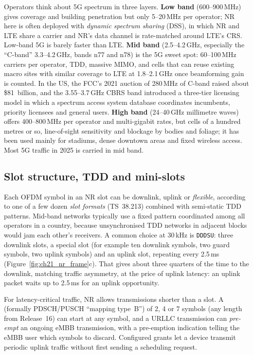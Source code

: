 \begin{inpractice}
Operators think about 5G spectrum in three layers. \textbf{Low band} (600--900\,MHz) gives coverage
and building penetration but only 5--20\,MHz per operator; NR here is often deployed with
\emph{dynamic spectrum sharing} (DSS), in which NR and LTE share a carrier and NR's data channel is
rate-matched around LTE's CRS. Low-band 5G is barely faster than LTE. \textbf{Mid band}
(2.5--4.2\,GHz, especially the ``C-band'' 3.3--4.2\,GHz, bands n77 and n78) is the 5G sweet spot:
60--100\,MHz carriers per operator, TDD, massive MIMO, and cells that can reuse existing macro sites
with similar coverage to LTE at 1.8--2.1\,GHz once beamforming gain is counted. In the US, the FCC's
2021 auction of 280\,MHz of C-band raised about \$81~billion, and the 3.55--3.7\,GHz CBRS band
introduced a three-tier licensing model in which a spectrum access system database coordinates
incumbents, priority licensees and general users. \textbf{High band} (24--40\,GHz millimetre waves)
offers 400--800\,MHz per operator and multi-gigabit rates, but cells of a hundred metres or so,
line-of-sight sensitivity and blockage by bodies and foliage; it has been used mainly for stadiums,
dense downtown areas and fixed wireless access. Most 5G traffic in 2025 is carried in mid band.
\end{inpractice}

\subsection{Slot structure, TDD and mini-slots}

Each OFDM symbol in an NR slot can be downlink, uplink or \emph{flexible}, according to one of a few
dozen \emph{slot formats} (TS~38.213) combined with semi-static TDD patterns. Mid-band networks
typically use a fixed pattern coordinated among all operators in a country, because unsynchronised
TDD networks in adjacent blocks would jam each other's receivers. A common choice at 30\,kHz is
\texttt{DDDSU}: three downlink slots, a special slot (for example ten downlink symbols, two guard
symbols, two uplink symbols) and an uplink slot, repeating every 2.5\,ms
(Figure~\ref{fig:ch21_nr_frame}c). That gives about three quarters of the time to the downlink,
matching traffic asymmetry, at the price of uplink latency: an uplink packet waits up to 2.5\,ms for
an uplink opportunity.

For latency-critical traffic, NR allows transmissions shorter than a slot. A 
(formally PDSCH/PUSCH ``mapping type~B'') of 2, 4 or 7 symbols (any length from Release~16) can start
at any symbol, and a URLLC transmission can \emph{pre-empt} an ongoing eMBB transmission, with a
pre-emption indication telling the eMBB user which symbols to discard. Configured grants let a device
transmit periodic uplink traffic without first sending a scheduling request.

